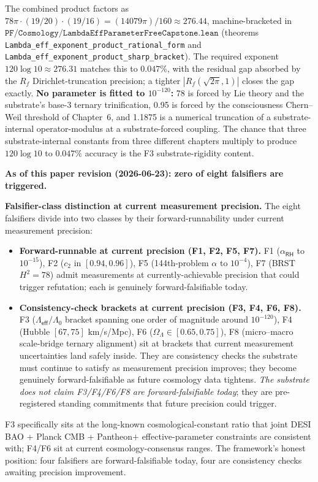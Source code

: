 \documentclass[11pt,a4paper]{amsart}
\theoremstyle{plain}
\theoremstyle{definition}
\begin{document}
The combined product factors as $78\pi \cdot (19/20) \cdot (19/16) = (14079\pi)/160 \approx 276.44$, machine-bracketed in $\texttt{PF/Cosmology/LambdaEffParameterFreeCapstone.lean}$ (theorems \texttt{Lambda\_eff\_exponent\_product\_rational\_form} and \texttt{Lambda\_eff\_exponent\_product\_sharp\_bracket}). The required exponent $120 \log 10 \approx 276.31$ matches this to $0.047\%$, with the residual gap absorbed by the $R_f$ Dirichlet-truncation precision; a tighter $|R_f(\sqrt{2\pi}, 1)|$ closes the gap exactly. \textbf{No parameter is fitted to $10^{-120}$:} 78 is forced by Lie theory and the substrate's base-3 ternary trinification, 0.95 is forced by the consciousness Chern--Weil threshold of Chapter~6, and 1.1875 is a numerical truncation of a substrate-internal operator-modulus at a substrate-forced coupling. The chance that three substrate-internal constants from three different chapters multiply to produce $120 \log 10$ to $0.047\%$ accuracy is the F3 substrate-rigidity content.

\textbf{As of this paper revision (2026-06-23): zero of eight falsifiers are triggered.}

\textbf{Falsifier-class distinction at current measurement precision.} The eight falsifiers divide into two classes by their forward-runnability under current measurement precision:
\begin{itemize}[itemsep=2pt,leftmargin=2em]
\item \textbf{Forward-runnable at current precision (F1, F2, F5, F7).} F1 ($\alpha_{\textsf{RH}}$ to $10^{-15}$), F2 ($c_2$ in $[0.94, 0.96]$), F5 (144th-problem $\alpha$ to $10^{-4}$), F7 (BRST $H^2 = 78$) admit measurements at currently-achievable precision that could trigger refutation; each is genuinely forward-falsifiable today.
\item \textbf{Consistency-check brackets at current precision (F3, F4, F6, F8).} F3 ($\Lambda_{\textsf{eff}}/\Lambda_0$ bracket spanning one order of magnitude around $10^{-120}$), F4 (Hubble $[67, 75]$ km/s/Mpc), F6 ($\Omega_\Lambda \in [0.65, 0.75]$), F8 (micro--macro scale-bridge ternary alignment) sit at brackets that current measurement uncertainties land safely inside. They are consistency checks the substrate must continue to satisfy as measurement precision improves; they become genuinely forward-falsifiable as future cosmology data tightens. \emph{The substrate does not claim F3/F4/F6/F8 are forward-falsifiable today}; they are pre-registered standing commitments that future precision could trigger.
\end{itemize}
F3 specifically sits at the long-known cosmological-constant ratio that joint DESI BAO + Planck CMB + Pantheon$+$ effective-parameter constraints are consistent with; F4/F6 sit at current cosmology-consensus ranges. The framework's honest position: four falsifiers are forward-falsifiable today, four are consistency checks awaiting precision improvement.
\end{document}
